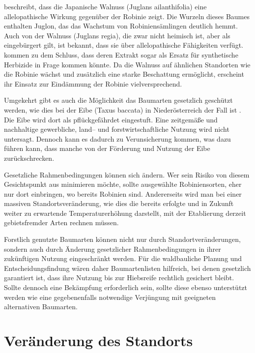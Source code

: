 \documentclass[twocolumn]{scrartcl}
\begin{document}
\citet{jung2010robinie} beschreibt, dass die Japanische
Walnuss (Juglans ailanthifolia) eine allelopathische Wirkung gegenüber
der Robinie zeigt.
Die Wurzeln dieses Baumes enthalten Juglon, das das
Wachstum von Robiniensämlingen deutlich hemmt.
Auch von der Walnuss
(Juglans regia), die zwar nicht heimisch ist, aber als eingebürgert
gilt, ist bekannt, dass sie über allelopathische Fähigkeiten
verfügt.
\citet{dordevic2022nussAllelopathi} kommen zu dem Schluss,
dass deren Extrakt sogar als Ersatz für synthetische Herbizide in
Frage kommen könnte.
Da die Walnuss auf ähnlichen Standorten wie die
Robinie wächst und zusätzlich eine starke Beschattung ermöglicht,
erscheint ihr Einsatz zur Eindämmung der Robinie vielversprechend.

Umgekehrt gibt es auch die Möglichkeit das Baumarten gesetzlich geschützt
werden, wie dies bei der Eibe (Taxus baccata) in Niederösterreich der Fall ist
\citep{niederoesterreich2000Naturschutzgesetz,niederoesterreich2005artenschutzverordnung}.
Die Eibe wird dort als pflückgefährdet eingestuft. Eine zeitgemäße und
nachhaltige gewerbliche, land-- und forstwirtschaftliche Nutzung wird nicht
untersagt. Dennoch kann es dadurch zu Verunsicherung kommen, was dazu führen
kann, dass manche von der Förderung und Nutzung der Eibe zurückschrecken.

Gesetzliche Rahmenbedingungen können sich ändern. Wer sein Risiko von diesem
Gesichtspunkt aus minimieren möchte, sollte ausgewählte Robiniensorten, eher nur
dort einbringen, wo bereits Robinien sind. Andererseits wird man bei einer
massiven Standortsveränderung, wie dies die bereits erfolgte und in Zukunft
weiter zu erwartende Temperaturerhöhung darstellt, mit der Etablierung derzeit
gebietsfremder Arten rechnen müssen.

Forstlich genutzte Baumarten können nicht nur durch Standortveränderungen,
sondern auch durch Änderung gesetzlicher Rahmenbedingungen in ihrer zukünftigen
Nutzung eingeschränkt werden. Für die waldbauliche Planung und
Entscheidungsfindung wären daher Baumartenlisten hilfreich, bei denen gesetzlich
garantiert ist, dass ihre Nutzung bis zur Hiebsreife rechtlich gesichert bleibt.
Sollte dennoch eine Bekämpfung erforderlich sein, sollte diese ebenso
unterstützt werden wie eine gegebenenfalls notwendige Verjüngung mit geeigneten
alternativen Baumarten.

\section{Veränderung des Standorts}
\end{document}
